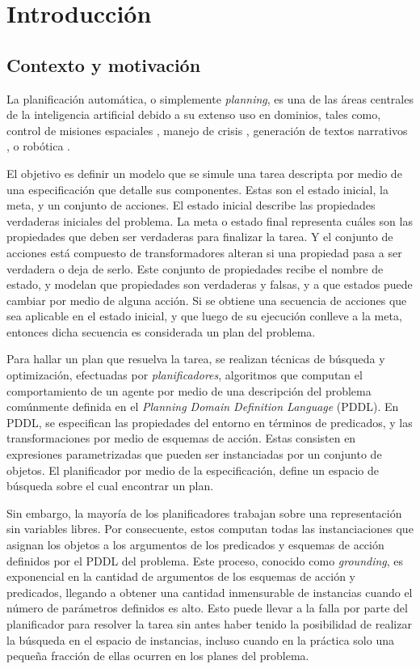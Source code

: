 \chapter{Introducción}
\label{ch:into}

\section{Contexto y motivación}
La planificación automática, o simplemente \emph{planning}, es una de las áreas
centrales de la inteligencia artificial debido a su extenso uso en dominios,
tales como, control de misiones espaciales \citep{RabideauG-et-al-2001}, manejo
de crisis \citep{Bienkowki-1995}, generación de textos narrativos
\citep{Goudoulakis-et-al-2016}, o robótica \citep{Munoz-et-al-2016}.

El objetivo es definir un modelo que se simule una tarea descripta por medio de una especificación que detalle sus componentes. Estas son el estado inicial, la meta, y un
conjunto de acciones. El estado inicial describe las propiedades verdaderas iniciales del problema. La meta o estado final representa cuáles son
las propiedades que deben ser verdaderas para finalizar la tarea. Y el conjunto de acciones está compuesto de
transformadores alteran si una propiedad pasa a ser verdadera o deja de serlo. Este conjunto de propiedades recibe el nombre de estado, y modelan que propiedades son verdaderas y falsas, y a que estados puede cambiar por medio de alguna acción. Si se obtiene
una secuencia de acciones que sea aplicable en el estado inicial, y que luego de
su ejecución conlleve a la meta, entonces dicha secuencia es considerada un plan
del problema.

Para hallar un plan que resuelva la tarea, se realizan técnicas de búsqueda y
optimización, efectuadas por \emph{planificadores}, algoritmos que computan el
comportamiento de un agente por medio de una descripción del problema comúnmente
definida en el \emph{Planning Domain Definition Language} (PDDL). En PDDL, se
especifican las propiedades del entorno en términos de predicados, y las
transformaciones por medio de esquemas de acción. Estas consisten en expresiones
parametrizadas que pueden ser instanciadas por un conjunto de objetos. El
planificador por medio de la especificación, define un espacio de búsqueda sobre
el cual encontrar un plan.

Sin embargo, la mayoría de los planificadores trabajan sobre una representación
sin variables libres. Por consecuente, estos computan todas las instanciaciones
que asignan los objetos a los argumentos de los predicados y esquemas de acción
definidos por el PDDL del problema. Este proceso, conocido como
\emph{grounding}, es exponencial en la cantidad de argumentos de los esquemas de
acción y predicados, llegando a obtener una cantidad inmensurable de instancias
cuando el número de parámetros definidos es alto. Esto puede llevar a la falla
por parte del planificador para resolver la tarea sin antes haber tenido la
posibilidad de realizar la búsqueda en el espacio de instancias, incluso cuando
en la práctica solo una pequeña fracción de ellas ocurren en los planes del
problema.
\citep{Gnad_Torralba_Dominguez_Areces_Bustos_2019}

